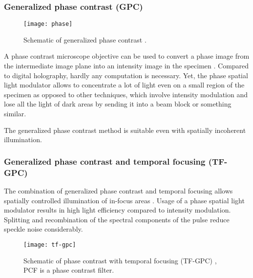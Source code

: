 \subsubsection{Generalized phase contrast (GPC)}
\begin{figure}[!hbt]
  \centering
  \texttt{[image: phase]} %
  \caption{Schematic of generalized phase contrast
    \citep[from][]{Rodrigo2008}.}
  \label{fig:phase}
\end{figure}
A phase contrast microscope objective  can be used to
convert a phase image from the intermediate image plane into an
intensity image in the specimen \citep{Rodrigo2008}. Compared to digital holography, hardly any computation is
necessary. Yet, the phase spatial light modulator allows to
concentrate a lot of light even on a small region of the specimen as
opposed to other techniques, which involve intensity modulation and
lose all the light of dark areas by sending it into a beam block or
something similar.

The generalized phase contrast method is suitable even with spatially
incoherent illumination.
\subsubsection{Generalized phase contrast and temporal focusing (TF-GPC)}
The combination of generalized phase contrast and temporal focusing
allows spatially controlled illumination of in-focus areas
\citep{Papagiakoumou2010}. Usage of a phase spatial light modulator
results in high light efficiency compared to intensity modulation.
Splitting and recombination of the spectral components of the pulse
reduce speckle noise considerably.
\begin{figure}[!hbt]
  \centering
  \texttt{[image: tf-gpc]} 
  \caption{Schematic of phase contrast with temporal focusing (TF-GPC)
    \citep[from][]{Papagiakoumou2010}, PCF is a phase contrast filter.}
  \label{fig:tf-gpc}
\end{figure}

